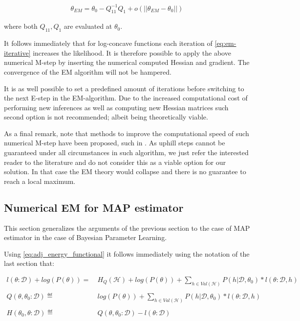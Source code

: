 \documentclass[11pt]{article}
\begin{document}
\begin{article}
\begin{align} 
 \theta_{EM}  = \theta_{0} - Q_{11}^{-1} Q_1 + o(||\theta_{EM} - \theta_{0}||) \label{eq:em-iterative}
\end{align}

where both \(Q_{11}, Q_{1}\) are evaluated at \(\theta_0\).

It follows immediately that for log-concave functions each
iteration of \ref{eq:em-iterative} increases the likelihood. It is
therefore possible to apply the above numerical M-step by inserting
the numerical computed Hessian and gradient. The convergence of the
EM algorithm will not be hampered.

It is as well possible to set a predefined amount of iterations
before switching to the next E-step in the EM-algorithm. Due to the
increased computational cost of performing new inferences as well
as computing new Hessian matrices such second option is not
recommended; albeit being theoretically viable.

As a final remark, note that methods to improve the computational
speed of such numerical M-step have been proposed, such in
\cite{Louis_1982}. As uphill steps cannot be guaranteed under all
circumstances in such algorithm, we just refer the interested
reader to the literature and do not consider this as a viable
option for our solution. In that case the EM theory would collapse
and there is no guarantee to reach a local maximum.

\subsection{Numerical EM for MAP estimator}
\label{sec:orgfb964a5}

This section generalizes the arguments of the previous section to
the case of MAP estimator in the case of Bayesian Parameter
Learning.

Using \ref{eq:adj_energy_functional} it follows immediately using the
notation of the last section that:

\begin{align} \label{eq:likelihood_energy_map_iterative}
l (\theta: \mathcal{D}) + log(P(\theta)) =& \ H_Q (\mathcal{H}) + log(P(\theta)) + \sum_{h \in Val(\mathcal{H})} P(h | \mathcal{D}, \theta_0) * l (\theta: \mathcal{D}, h)\\
\nonumber\\
Q(\theta, \theta_0 : \mathcal{D}) \eqdef& \ log(P(\theta)) + \sum_{h \in Val(\mathcal{H})} P(h | \mathcal{D}, \theta_0) * l (\theta: \mathcal{D}, h)\\
\nonumber\\  
H(\theta_0, \theta: \mathcal{D}) \eqdef& \ Q(\theta, \theta_0 : \mathcal{D}) - l (\theta: \mathcal{D}) 
\end{align}


\end{article}
\end{document}
